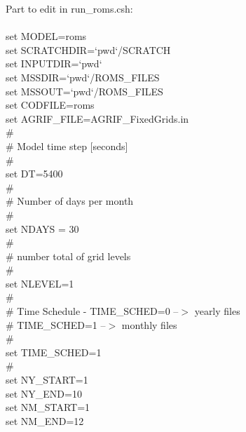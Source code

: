 Part to edit in run\_roms.csh:\\
\\
set MODEL=roms \\
set SCRATCHDIR=`pwd`/SCRATCH \\
set INPUTDIR=`pwd` \\
set MSSDIR=`pwd`/ROMS\_FILES \\
set MSSOUT=`pwd`/ROMS\_FILES \\
set CODFILE=roms \\
set AGRIF\_FILE=AGRIF\_FixedGrids.in \\
\# \\
\# Model time step [seconds] \\
\# \\
set DT=5400 \\
\# \\
\# Number of days per month \\
\# \\
set NDAYS = 30 \\
\# \\
\# number total of grid levels \\
\# \\
set NLEVEL=1 \\
\# \\
\#  Time Schedule  -  TIME\_SCHED=0 --$>$ yearly files \\
\#                    TIME\_SCHED=1 --$>$ monthly files \\
\# \\
set TIME\_SCHED=1 \\
\# \\
set NY\_START=1 \\
set NY\_END=10 \\
set NM\_START=1 \\
set NM\_END=12 \\
\\


